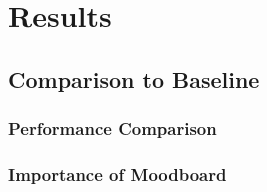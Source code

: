 \chapter{Results}

\section{Comparison to Baseline}

\subsection{Performance Comparison}

\subsection{Importance of Moodboard}